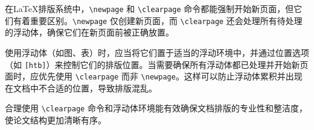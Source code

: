 在\LaTeX{}排版系统中，\verb|\newpage| 和 \verb|\clearpage| 命令都能强制开始新页面，但它们有着重要区别。\verb|\newpage| 仅创建新页面，而 \verb|\clearpage| 还会处理所有待处理的浮动体，确保它们在新页面前被正确放置。

使用浮动体（如图、表）时，应当将它们置于适当的浮动环境中，并通过位置选项（如 \verb|[htb]|）来控制它们的排版位置。当需要确保所有浮动体都已处理并开始新页面时，应优先使用 \verb|\clearpage| 而非 \verb|\newpage|。这样可以防止浮动体累积并出现在文档中不合适的位置，导致排版混乱。

合理使用 \verb|\clearpage| 命令和浮动体环境能有效确保文档排版的专业性和整洁度，使论文结构更加清晰有序。
